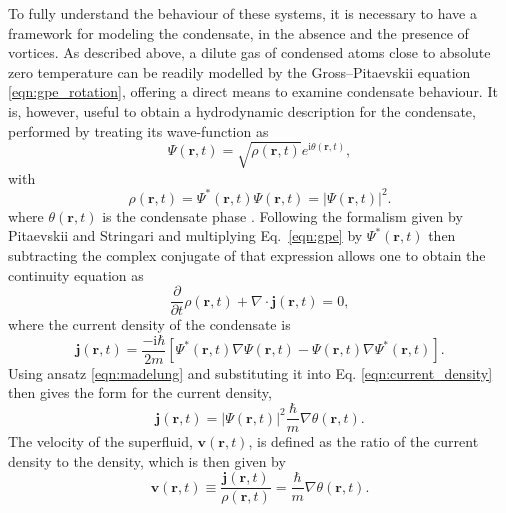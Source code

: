 To fully understand the behaviour of these systems, it is necessary to have a framework for modeling the condensate, in the absence and the presence of vortices. As described above, a dilute gas of condensed atoms close to absolute zero temperature can be readily modelled by the Gross--Pitaevskii equation \eqref{eqn:gpe_rotation}, offering a direct means to examine condensate behaviour. It is, however, useful to obtain a hydrodynamic description for the condensate, performed by treating its wave-function as
\begin{equation}\label{eqn:madelung}
\Psi(\textbf{r},t) = \sqrt{\rho(\mathbf{r},t)} e^{\textrm{i}\theta(\textbf{r},t)},
\end{equation}
with
\begin{equation}\label{eqn:density}
\rho(\textbf{r},t) = \Psi^*(\textbf{r},t)\Psi(\textbf{r},t) = \vert \Psi (\textbf{r},t) \vert ^2.
\end{equation}
where $\theta(\textbf{r},t)$ is the condensate phase \cite{BK:Pitaevskii_Stringari_2003}. Following the formalism given by Pitaevskii and Stringari \cite{BK:Pitaevskii_Stringari_2003} and multiplying Eq.~\eqref{eqn:gpe} by $\Psi^{*}(\mathbf{r},t)$ then subtracting the complex conjugate of that expression allows one to obtain the continuity equation as
\begin{equation}\label{eqn:continuity}
\frac{\partial}{\partial t}\rho(\textbf{r},t)  + \nabla\cdot \textbf{j}(\textbf{r},t) = 0,
\end{equation}
where the current density of the condensate is
\begin{equation}\label{eqn:current_density}
\textbf{j}(\textbf{r},t) = \frac{-\textrm{i}\hbar}{2m}\left[\Psi^*(\textbf{r},t)\nabla\Psi(\textbf{r},t) - \Psi(\textbf{r},t)\nabla\Psi^*(\textbf{r},t)\right].
\end{equation}
Using ansatz \eqref{eqn:madelung} and substituting it into Eq. \eqref{eqn:current_density} then gives the form for the current density,
\begin{equation}
\textbf{j}(\textbf{r},t) = \vert\Psi(\textbf{r},t)\vert ^2\frac{\hbar}{m}\nabla\theta(\textbf{r},t).
\end{equation}
The velocity of the superfluid, $\textbf{v}(\textbf{r},t)$, is defined as the ratio of the current density to the density, which is then given by
\begin{equation}\label{eqn:velocity}
\textbf{v}(\textbf{r},t)\equiv \frac{\textbf{j}(\textbf{r},t)}{\rho(\textbf{r},t)} = \frac{\hbar}{m}\nabla\theta(\textbf{r},t).
\end{equation}
